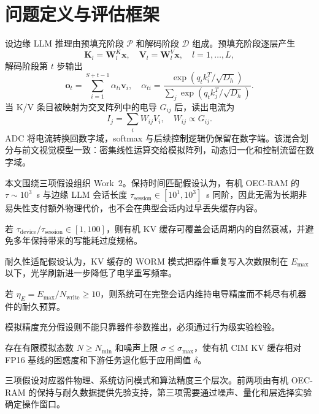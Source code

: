 \FloatBarrier

\section{问题定义与评估框架}
\label{sec:work2_problem}
\label{sec:work2_models}

设边缘 LLM 推理由预填充阶段 $\mathcal{P}$ 和解码阶段 $\mathcal{D}$ 组成。预填充阶段逐层产生
\begin{equation}
\mathbf{K}_l = \mathbf{W}_l^K \mathbf{x}, \quad \mathbf{V}_l = \mathbf{W}_l^V \mathbf{x}, \quad l = 1, \dots, L,
\label{eq:kv_compute}
\end{equation}
解码阶段第 $t$ 步输出
\begin{equation}
\mathbf{o}_t = \sum_{i=1}^{S+t-1} \alpha_{ti} \mathbf{v}_i, \quad \alpha_{ti} = \frac{\exp(q_t k_i^T / \sqrt{D_h})}{\sum_j \exp(q_t k_j^T / \sqrt{D_h})}.
\label{eq:attention_detail}
\end{equation}
当 K/V 条目被映射为交叉阵列中的电导 $G_{ij}$ 后，读出电流为
\begin{equation}
I_j = \sum_i W_{ij} V_i, \quad W_{ij} \propto G_{ij}.
\label{eq:crossbar_mvm}
\end{equation}
ADC 将电流转换回数字域，softmax 与后续控制逻辑仍保留在数字端。该混合划分与前文视觉模型一致：密集线性运算交给模拟阵列，动态归一化和控制流留在数字域。

本文围绕三项假设组织 Work~2。保持时间匹配假设认为，有机 OEC-RAM 的 $\tau\sim10^3$~s 与边缘 LLM 会话长度 $\tau_{\text{session}}\in[10^1,10^3]$~s 同阶，因此无需为长期非易失性支付额外物理代价，也不会在典型会话内过早丢失缓存内容。
\begin{hypothesis}[保持时间匹配假设]
若 $\tau_{\text{device}}/\tau_{\text{session}}\in[1,100]$，则有机 KV 缓存可覆盖会话周期内的自然衰减，并避免多年保持带来的写能耗过度规格。
\label{hyp:retention}
\end{hypothesis}
耐久性适配假设认为，KV 缓存的 WORM 模式把器件重复写入次数限制在 $E_{\text{max}}$ 以下，光学刷新进一步降低了电学重写频率。
\begin{hypothesis}[耐久性适配假设]
若 $\eta_E=E_{\text{max}}/N_{\text{write}}\ge10$，则系统可在完整会话内维持电导精度而不耗尽有机器件的耐久预算。
\label{hyp:endurance}
\end{hypothesis}
模拟精度充分假设则不能只靠器件参数推出，必须通过行为级实验检验。
\begin{hypothesis}[模拟精度充分假设]
存在有限模拟态数 $N\ge N_{\text{min}}$ 和噪声上限 $\sigma\le\sigma_{\text{max}}$，使有机 CIM KV 缓存相对 FP16 基线的困惑度和下游任务退化低于应用阈值 $\delta$。
\label{hyp:precision}
\end{hypothesis}
三项假设对应器件物理、系统访问模式和算法精度三个层次。前两项由有机 OEC-RAM 的保持与耐久数据提供先验支持，第三项需要通过噪声、量化和层选择实验确定操作窗口。

